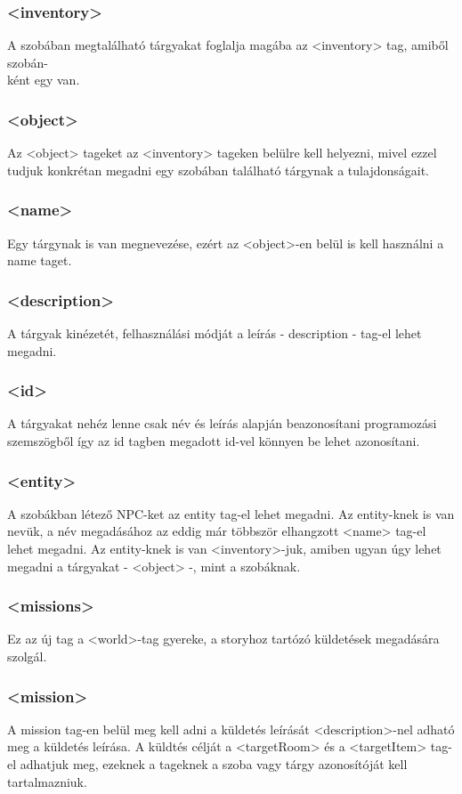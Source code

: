 \documentclass{scrarticle}
\begin{document}
\subsubsection{<inventory>}
A szobában megtalálható tárgyakat foglalja magába az <inventory> tag, amiből szobán-\\ként egy van.

\subsubsection{<object>}
Az <object> tageket az <inventory> tageken belülre kell helyezni, mivel ezzel tudjuk konkrétan megadni egy szobában található tárgynak a tulajdonságait.

\subsubsection{<name>}
Egy tárgynak is van megnevezése, ezért az <object>-en belül is kell használni a name taget.

\subsubsection{<description>}
A tárgyak kinézetét, felhasználási módját a leírás - description - tag-el lehet megadni.

\subsubsection{<id>}
A tárgyakat nehéz lenne csak név és leírás alapján beazonosítani programozási szemszögből így az id tagben megadott id-vel könnyen be lehet azonosítani.

\subsubsection{<entity>}
A szobákban létező NPC-ket az entity tag-el lehet megadni. Az entity-knek is van nevük, a név megadásához az eddig már többször elhangzott <name> tag-el lehet megadni. Az entity-knek is van <inventory>-juk, amiben ugyan úgy lehet megadni a tárgyakat - <object> -, mint a szobáknak.

\subsubsection{<missions>}
Ez az új tag a <world>-tag gyereke, a storyhoz tartózó küldetések megadására szolgál.

\subsubsection{<mission>}
A mission tag-en belül meg kell adni a küldetés leírását <description>-nel adható meg a küldetés leírása. A küldtés célját a <targetRoom> és a <targetItem> tag-el adhatjuk meg, ezeknek a tageknek a szoba vagy tárgy azonosítóját kell tartalmazniuk.
\end{document}
